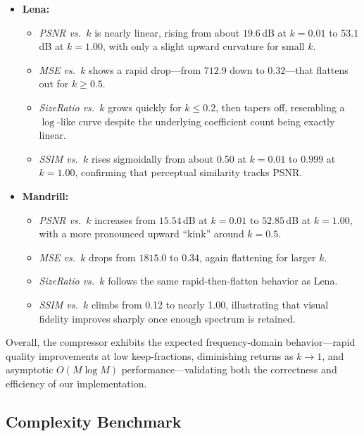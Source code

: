 \documentclass[12pt]{article}
\begin{document}
\begin{itemize}
  \item \textbf{Lena:}  
    \begin{itemize}
      \item \emph{PSNR vs.\ \(k\)} is nearly linear, rising from about \(19.6\)\,dB at \(k=0.01\) to \(53.1\)\,dB at \(k=1.00\), with only a slight upward curvature for small \(k\).  
      \item \emph{MSE vs.\ \(k\)} shows a rapid drop—from \(712.9\) down to \(0.32\)—that flattens out for \(k\ge0.5\).  
      \item \emph{SizeRatio vs.\ \(k\)} grows quickly for \(k\le0.2\), then tapers off, resembling a \(\log\)-like curve despite the underlying coefficient count being exactly linear.  
      \item \emph{SSIM vs.\ \(k\)} rises sigmoidally from about 0.50 at \(k=0.01\) to \(0.999\) at \(k=1.00\), confirming that perceptual similarity tracks PSNR.  
    \end{itemize}

  \item \textbf{Mandrill:}  
    \begin{itemize}
      \item \emph{PSNR vs.\ \(k\)} increases from \(15.54\)\,dB at \(k=0.01\) to \(52.85\)\,dB at \(k=1.00\), with a more pronounced upward “kink” around \(k=0.5\).  
      \item \emph{MSE vs.\ \(k\)} drops from \(1815.0\) to \(0.34\), again flattening for larger \(k\).  
      \item \emph{SizeRatio vs.\ \(k\)} follows the same rapid‐then‐flatten behavior as Lena.  
      \item \emph{SSIM vs.\ \(k\)} climbs from 0.12 to nearly 1.00, illustrating that visual fidelity improves sharply once enough spectrum is retained.  
    \end{itemize}
\end{itemize}

\noindent Overall, the compressor exhibits the expected frequency-domain behavior—rapid quality improvements at low keep-fractions, diminishing returns as \(k\to1\), and asymptotic \(O(M\log M)\) performance—validating both the correctness and efficiency of our implementation.



\subsection{Complexity Benchmark}
\end{document}
